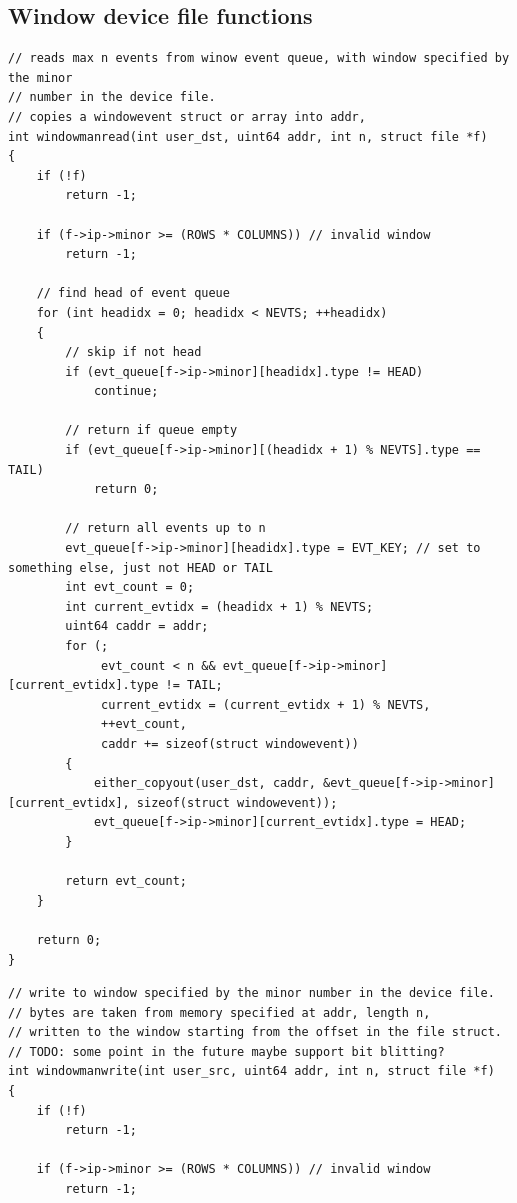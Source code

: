 \begin{appendices}
\section{Window device file functions}
\label{appendix:c:7}
\begin{verbatim}
// reads max n events from winow event queue, with window specified by the minor
// number in the device file.
// copies a windowevent struct or array into addr,
int windowmanread(int user_dst, uint64 addr, int n, struct file *f)
{
    if (!f)
        return -1;

    if (f->ip->minor >= (ROWS * COLUMNS)) // invalid window
        return -1;

    // find head of event queue
    for (int headidx = 0; headidx < NEVTS; ++headidx)
    {
        // skip if not head
        if (evt_queue[f->ip->minor][headidx].type != HEAD)
            continue;
        
        // return if queue empty
        if (evt_queue[f->ip->minor][(headidx + 1) % NEVTS].type == TAIL)
            return 0;

        // return all events up to n
        evt_queue[f->ip->minor][headidx].type = EVT_KEY; // set to something else, just not HEAD or TAIL
        int evt_count = 0;
        int current_evtidx = (headidx + 1) % NEVTS;
        uint64 caddr = addr;
        for (;
             evt_count < n && evt_queue[f->ip->minor][current_evtidx].type != TAIL;
             current_evtidx = (current_evtidx + 1) % NEVTS,
             ++evt_count,
             caddr += sizeof(struct windowevent))
        {
            either_copyout(user_dst, caddr, &evt_queue[f->ip->minor][current_evtidx], sizeof(struct windowevent));
            evt_queue[f->ip->minor][current_evtidx].type = HEAD;
        }

        return evt_count;
    }

    return 0;
}
\end{verbatim}
\pagebreak
\begin{verbatim}
// write to window specified by the minor number in the device file.
// bytes are taken from memory specified at addr, length n,
// written to the window starting from the offset in the file struct.
// TODO: some point in the future maybe support bit blitting?
int windowmanwrite(int user_src, uint64 addr, int n, struct file *f)
{
    if (!f)
        return -1;

    if (f->ip->minor >= (ROWS * COLUMNS)) // invalid window
        return -1;


\end{verbatim}
\end{appendices}
